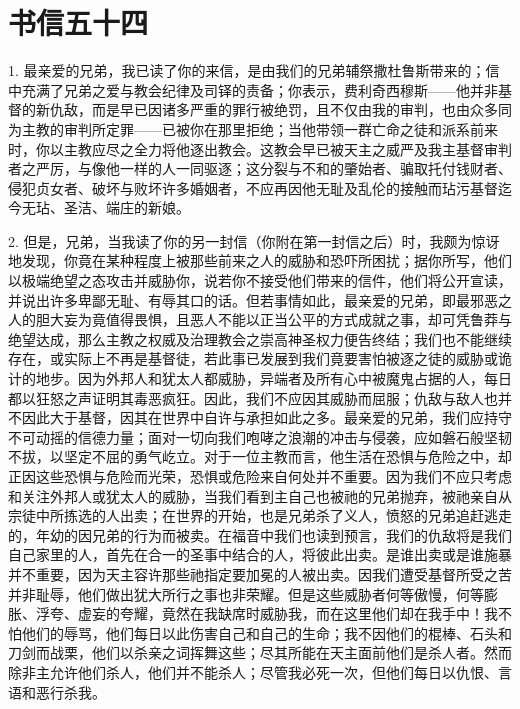 
\section{书信五十四}

\par

\par

1. 最亲爱的兄弟，我已读了你的来信，是由我们的兄弟辅祭撒杜鲁斯带来的；信中充满了兄弟之爱与教会纪律及司铎的责备；你表示，费利奇西穆斯——他并非基督的新仇敌，而是早已因诸多严重的罪行被绝罚，且不仅由我的审判，也由众多同为主教的审判所定罪——已被你在那里拒绝；当他带领一群亡命之徒和派系前来时，你以主教应尽之全力将他逐出教会。这教会早已被天主之威严及我主基督审判者之严厉，与像他一样的人一同驱逐；这分裂与不和的肇始者、骗取托付钱财者、侵犯贞女者、破坏与败坏许多婚姻者，不应再因他无耻及乱伦的接触而玷污基督迄今无玷、圣洁、端庄的新娘。\par

2. 但是，兄弟，当我读了你的另一封信（你附在第一封信之后）时，我颇为惊讶地发现，你竟在某种程度上被那些前来之人的威胁和恐吓所困扰；据你所写，他们以极端绝望之态攻击并威胁你，说若你不接受他们带来的信件，他们将公开宣读，并说出许多卑鄙无耻、有辱其口的话。但若事情如此，最亲爱的兄弟，即最邪恶之人的胆大妄为竟值得畏惧，且恶人不能以正当公平的方式成就之事，却可凭鲁莽与绝望达成，那么主教之权威及治理教会之崇高神圣权力便告终结；我们也不能继续存在，或实际上不再是基督徒，若此事已发展到我们竟要害怕被逐之徒的威胁或诡计的地步。因为外邦人和犹太人都威胁，异端者及所有心中被魔鬼占据的人，每日都以狂怒之声证明其毒恶疯狂。因此，我们不应因其威胁而屈服；仇敌与敌人也并不因此大于基督，因其在世界中自许与承担如此之多。最亲爱的兄弟，我们应持守不可动摇的信德力量；面对一切向我们咆哮之浪潮的冲击与侵袭，应如磐石般坚韧不拔，以坚定不屈的勇气屹立。对于一位主教而言，他生活在恐惧与危险之中，却正因这些恐惧与危险而光荣，恐惧或危险来自何处并不重要。因为我们不应只考虑和关注外邦人或犹太人的威胁，当我们看到主自己也被祂的兄弟抛弃，被祂亲自从宗徒中所拣选的人出卖；在世界的开始，也是兄弟杀了义人，愤怒的兄弟追赶逃走的，年幼的因兄弟的行为而被卖。在福音中我们也读到预言，我们的仇敌将是我们自己家里的人，首先在合一的圣事中结合的人，将彼此出卖。是谁出卖或是谁施暴并不重要，因为天主容许那些祂指定要加冕的人被出卖。因我们遭受基督所受之苦并非耻辱，他们做出犹大所行之事也非荣耀。但是这些威胁者何等傲慢，何等膨胀、浮夸、虚妄的夸耀，竟然在我缺席时威胁我，而在这里他们却在我手中！我不怕他们的辱骂，他们每日以此伤害自己和自己的生命；我不因他们的棍棒、石头和刀剑而战栗，他们以杀亲之词挥舞这些；尽其所能在天主面前他们是杀人者。然而除非主允许他们杀人，他们并不能杀人；尽管我必死一次，但他们每日以仇恨、言语和恶行杀我。\par

